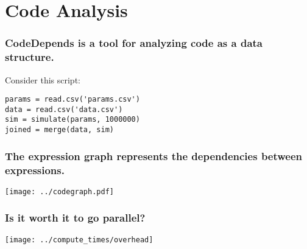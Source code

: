 \documentclass{beamer}
\begin{document}
\section{Code Analysis}
\begin{frame}[fragile]

    \frametitle{CodeDepends is a tool for analyzing code as a data
    structure.}


    Consider this script:

\begin{verbatim}
params = read.csv('params.csv')
data = read.csv('data.csv')
sim = simulate(params, 1000000)
joined = merge(data, sim)
\end{verbatim}

\end{frame}
\begin{frame}

    \frametitle{The expression graph represents the dependencies between
    expressions.}


    \centerline{\texttt{[image: ../codegraph.pdf]}}

\end{frame}
\begin{frame}


\frametitle{Is it worth it to go parallel?}


    \centerline{\texttt{[image: ../compute\_times/overhead]}}

\end{frame}
\end{document}
